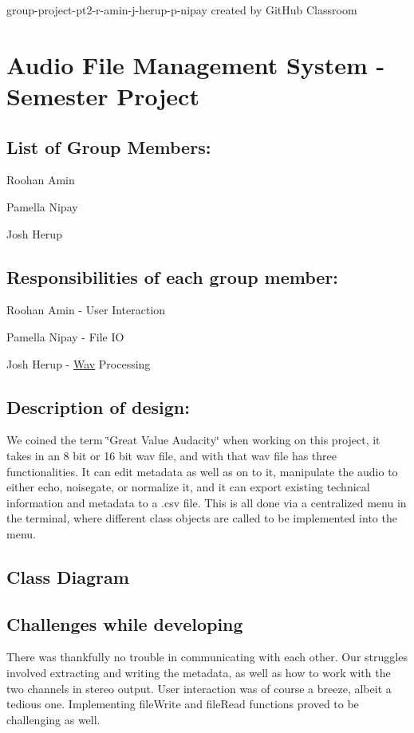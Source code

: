 group-\/project-\/pt2-\/r-\/amin-\/j-\/herup-\/p-\/nipay created by Git\+Hub Classroom \section*{Audio File Management System -\/ Semester Project}

\subsection*{List of Group Members\+:}


\begin{DoxyItemize}
\item Roohan Amin 
\item Pamella Nipay 
\item Josh Herup 
\end{DoxyItemize}

\subsection*{Responsibilities of each group member\+:}


\begin{DoxyItemize}
\item Roohan Amin -\/ User Interaction 
\item Pamella Nipay -\/ File IO 
\item Josh Herup -\/ \hyperlink{classWav}{Wav} Processing 
\end{DoxyItemize}

\subsection*{Description of design\+:}

We coined the term \char`\"{}\+Great Value Audacity\char`\"{} when working on this project, it takes in an 8 bit or 16 bit wav file, and with that wav file has three functionalities. It can edit metadata as well as on to it, manipulate the audio to either echo, noisegate, or normalize it, and it can export existing technical information and metadata to a .csv file. This is all done via a centralized menu in the terminal, where different class objects are called to be implemented into the menu.

\subsection*{Class Diagram}



\subsection*{Challenges while developing}

There was thankfully no trouble in communicating with each other. Our struggles involved extracting and writing the metadata, as well as how to work with the two channels in stereo output. User interaction was of course a breeze, albeit a tedious one. Implementing file\+Write and file\+Read functions proved to be challenging as well. 